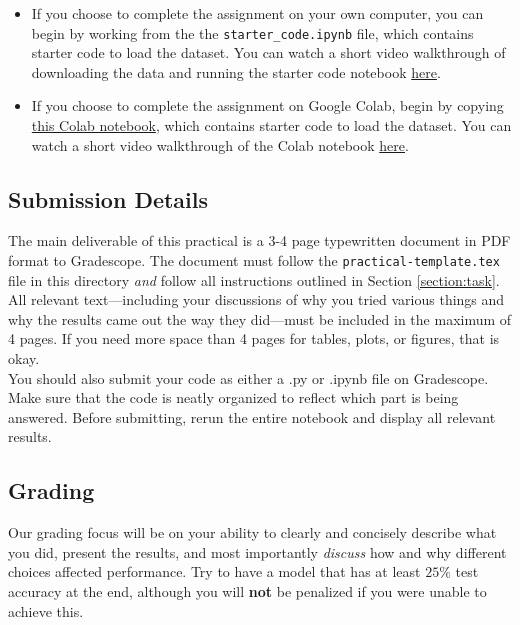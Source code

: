 \documentclass[12pt]{article}
\begin{document}
\begin{itemize}
    \item If you choose to complete the assignment on your own computer, you can begin by working from the the \texttt{starter\_code.ipynb} file, which contains starter code to load the dataset. You can watch a short video walkthrough of downloading the data and running the starter code notebook \href{https://harvard.zoom.us/rec/share/cej4SbOhKoxWDXGINxjow7eGhK_UA2IW_6pxcWdnk7GjCqQDvBB0dejO1XfvdUyC.gSKJkuqNFORO8QJo}{here}.
    \item If you choose to complete the assignment on Google Colab, begin by copying \href{https://colab.research.google.com/drive/1HO6rKLHaaFohXxPjDSaEqgwzdTaPuOBP?usp=sharing}{this Colab notebook}, which contains starter code to load the dataset.  You can watch a short video walkthrough of the Colab notebook \href{https://harvard.zoom.us/rec/share/VwVJlAqCM5zODKRDStiVwHPzVX2aduA5YQBK1AWy1oVNNL60DHYXHOUEcMk1Kdhe.ljdo3HSdxyHgg1zt}{here}.
\end{itemize}

\subsection{Submission Details}
The main deliverable of this practical is a 3-4 page typewritten document in PDF format to Gradescope.  The document must follow the
\texttt{practical-template.tex} file in this directory \emph{and} follow all instructions outlined in Section \ref{section:task}.  All relevant text---including your discussions of why you tried various things and why the results came out the way they did---must be included in the maximum of 4 pages.  If you need more space than 4 pages for tables, plots, or figures, that is okay. \\

\noindent You should also submit your code as either a .py or .ipynb file on Gradescope. Make sure that the code is neatly organized to reflect which part is being answered. Before submitting, rerun the entire notebook and display all relevant results.

\subsection{Grading}\label{section:grading}

Our grading focus will be on your ability to clearly and concisely describe what you did, present the results, and most importantly \emph{discuss} how and why different choices affected performance. Try to have a model that has at least $25\%$ test accuracy at the end, although you will \textbf{not} be penalized if you were unable to achieve this. \\
\end{document}
